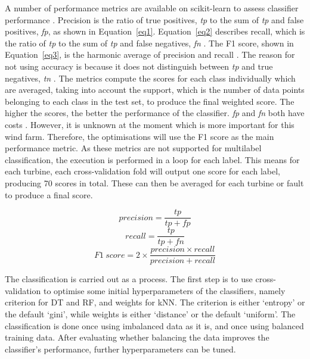 A number of performance metrics are available on scikit-learn to assess classifier performance \cite{33M}. Precision is the ratio of true positives, \textit{tp} to the sum of \textit{tp} and false positives, \textit{fp}, as shown in Equation~\ref{eq1}. Equation~\ref{eq2} describes recall, which is the ratio of \textit{tp} to the sum of \textit{tp} and false negatives, \textit{fn} \cite{deRu15}. The F1 score, shown in Equation~\ref{eq3}, is the harmonic average of precision and recall \cite{Perfo}. The reason for not using accuracy is because it does not distinguish between \textit{tp} and true negatives, \textit{tn} \cite{Perfo,SASH}. The metrics compute the scores for each class individually which are averaged, taking into account the support, which is the number of data points belonging to each class in the test set, to produce the final weighted score. The higher the scores, the better the performance of the classifier. \textit{fp} and \textit{fn} both have costs \cite{Perfo}. However, it is unknown at the moment which is more important for this wind farm. Therefore, the optimisations will use the F1 score as the main performance metric. As these metrics are not supported for multilabel classification, the execution is performed in a loop for each label. This means for each turbine, each cross-validation fold will output one score for each label, producing 70 scores in total. These can then be averaged for each turbine or fault to produce a final score.

\begin{equation}
    \label{eq1}
    precision = \frac{tp}{tp + fp}
\end{equation}
\begin{equation}
    \label{eq2}
    recall = \frac{tp}{tp + fn}
\end{equation}
\begin{equation}
    \label{eq3}
    F1~score = 2 \times \frac{precision \times recall}{precision + recall}
\end{equation}

The classification is carried out as a process. The first step is to use cross-validation to optimise some initial hyperparameters of the classifiers, namely criterion for DT and RF, and weights for kNN. The criterion is either `entropy' or the default `gini', while weights is either `distance' or the default `uniform'. The classification is done once using imbalanced data as it is, and once using balanced training data. After evaluating whether balancing the data improves the classifier's performance, further hyperparameters can be tuned.
